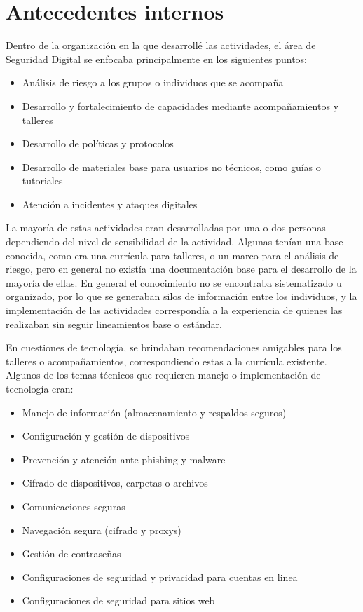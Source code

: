 \documentclass[12pt]{caltech_thesis}
\begin{document}
\section{Antecedentes internos}

Dentro de la organización en la que desarrollé las actividades, el área de Seguridad Digital se enfocaba principalmente en los siguientes puntos:

\begin{itemize}
    \item Análisis de riesgo a los grupos o individuos que se acompaña
    \item Desarrollo y fortalecimiento de capacidades mediante acompañamientos y talleres
    \item Desarrollo de políticas y protocolos
    \item Desarrollo de materiales base para usuarios no técnicos, como guías o tutoriales
    \item Atención a incidentes y ataques digitales
\end{itemize}

La mayoría de estas actividades eran desarrolladas por una o dos personas dependiendo del nivel de sensibilidad de la actividad. Algunas tenían una base conocida, como era una currícula para talleres, o un marco para el análisis de riesgo, pero en general no existía una documentación base para el desarrollo de la mayoría de ellas. En general el conocimiento no se encontraba sistematizado u organizado, por lo que se generaban silos de información entre los individuos, y la implementación de las actividades correspondía a la experiencia de quienes las realizaban sin seguir lineamientos base o estándar.

En cuestiones de tecnología, se brindaban recomendaciones amigables para los talleres o acompañamientos, correspondiendo estas a la currícula existente. Algunos de los temas técnicos que requieren manejo o implementación de tecnología eran:

\begin{itemize}
    \item Manejo de información (almacenamiento y respaldos seguros)
    \item Configuración y gestión de dispositivos
    \item Prevención y atención ante phishing y malware
    \item Cifrado de dispositivos, carpetas o archivos
    \item Comunicaciones seguras
    \item Navegación segura (cifrado y proxys)
    \item Gestión de contraseñas
    \item Configuraciones de seguridad y privacidad para cuentas en linea
    \item Configuraciones de seguridad para sitios web
\end{itemize}
\end{document}
